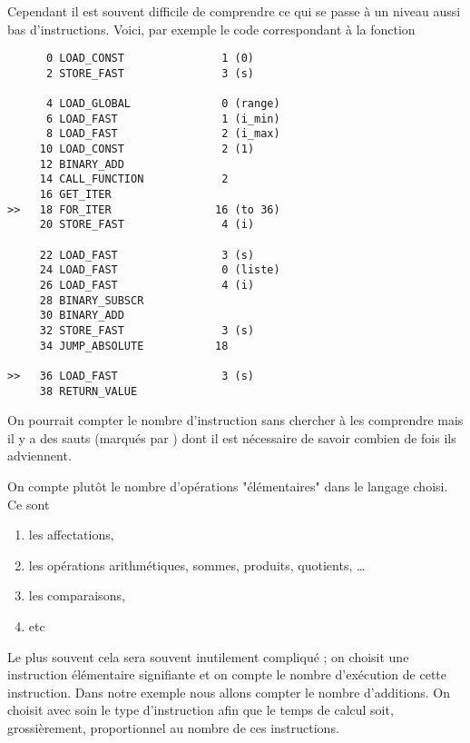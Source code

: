 Cependant il est souvent difficile de comprendre ce qui se passe  à un niveau aussi bas d'instructions. Voici, par exemple le code correspondant à la fonction 
\begin{lstlisting}
      0 LOAD_CONST               1 (0)
      2 STORE_FAST               3 (s)

      4 LOAD_GLOBAL              0 (range)
      6 LOAD_FAST                1 (i_min)
      8 LOAD_FAST                2 (i_max)
     10 LOAD_CONST               2 (1)
     12 BINARY_ADD
     14 CALL_FUNCTION            2
     16 GET_ITER
>>   18 FOR_ITER                16 (to 36)
     20 STORE_FAST               4 (i)

     22 LOAD_FAST                3 (s)
     24 LOAD_FAST                0 (liste)
     26 LOAD_FAST                4 (i)
     28 BINARY_SUBSCR
     30 BINARY_ADD
     32 STORE_FAST               3 (s)
     34 JUMP_ABSOLUTE           18

>>   36 LOAD_FAST                3 (s)
     38 RETURN_VALUE
\end{lstlisting}
On pourrait compter le nombre d'instruction sans chercher à les comprendre mais il y a des sauts (marqués par \type{>>}) dont il est nécessaire de savoir combien de fois ils adviennent.

\medskip


On compte plutôt le nombre d'opérations "élémentaires" dans le langage choisi. Ce sont
\begin{enumerate}
\item les affectations,
\item les opérations arithmétiques, sommes, produits, quotients, \dots
\item les comparaisons,
\item etc
\end{enumerate}

\medskip

Le plus souvent  cela sera souvent inutilement compliqué ; on choisit une instruction élémentaire signifiante et on compte le nombre d'exécution de cette instruction. Dans notre exemple nous allons compter le nombre d'additions. On choisit avec soin le type d'instruction afin que le temps de calcul soit, grossièrement, proportionnel au nombre de ces instructions.
